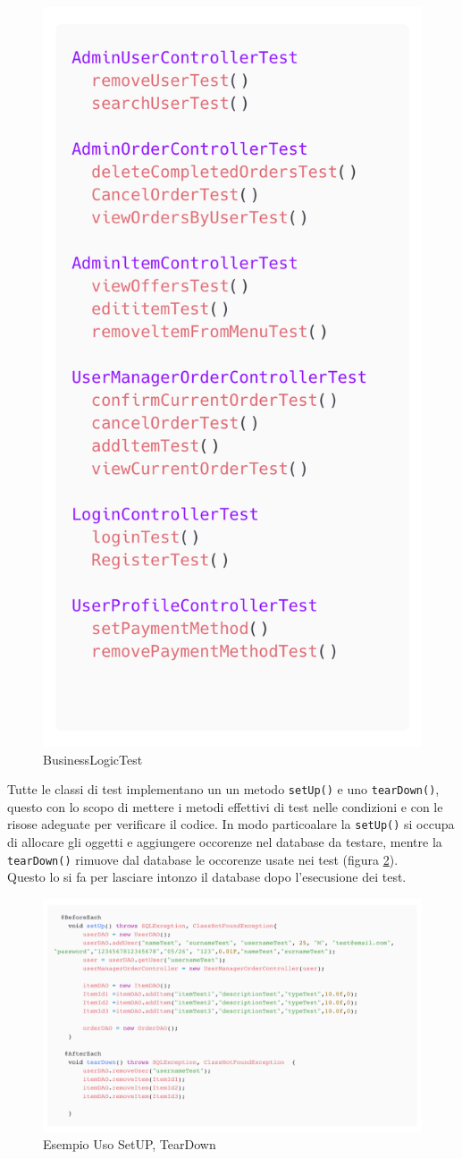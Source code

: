 \documentclass{article}
\begin{document}
\begin{figure}[!h]
    \centering
    \includegraphics[width=0.3\linewidth]{imgs/BusinessLogicTest.png}
    \caption{BusinessLogicTest}
    \label{BusinessLogicTest}
\end{figure}

Tutte le classi di test implementano un un metodo \texttt{setUp()} e uno \texttt{tearDown()}, questo con lo scopo di mettere i metodi effettivi di test nelle condizioni e con le risose adeguate per verificare il codice. In modo particoalare la \texttt{setUp()} si occupa di allocare gli oggetti e aggiungere occorenze nel database da testare, mentre la \texttt{tearDown()} rimuove dal database le occorenze usate nei test (figura \ref{SetUP-TearDown}).\\ Questo lo si fa per lasciare intonzo il database dopo l'esecusione dei test.


\begin{figure}[!h]
    \centering
    \includegraphics[width=1.0\linewidth]{imgs/snippets/SetUp-TearDown.png}
    \caption{Esempio Uso SetUP, TearDown}
    \label{SetUP-TearDown}
\end{figure}
\end{document}
